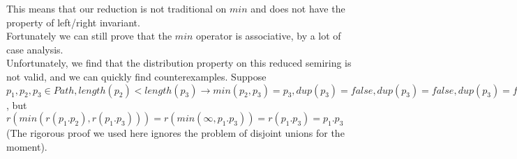 \documentclass[a4paper,10pt]{article}
\begin{document}
This means that our reduction is not traditional on $min$ and does not have the property of left/right invariant.\\
Fortunately we can still prove that the $min$ operator is associative, by a lot of case analysis.\\
Unfortunately, we find that the distribution property on this reduced semiring is not valid, and we can quickly find counterexamples.
Suppose $p_1,p_2,p_3 \in Path, length (p_2) < length(p_3) \rightarrow min(p_2,p_3) = p_3, dup(p_3) = false,dup(p_3) = false,dup(p_3) = false,dup(p_1 . p_2) = true,dup(p_1 . p_3) = false, r(p_1 . r(min (p_2,p_3))) = r(p_1 . r(p_2)) = r(p_1 . p_2) = \infty$, but $r(min(r(p_1 . p_2),r(p_1 . p_3))) = r(min(\infty,p_1 . p_3)) = r(p_1 . p_3) = p_1 . p_3$ (The rigorous proof we used here ignores the problem of disjoint unions for the moment).\\
\end{document}
